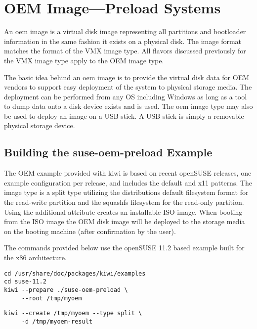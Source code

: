 \chapter{OEM Image---Preload Systems}
\label{chapter:oem}
\minitoc

An oem image is a virtual disk image representing all partitions
and bootloader information in the same fashion it exists on a physical
disk. The image format matches the format of the VMX image type. All flavors
discussed previously for the VMX image type apply to the OEM image type.

The basic idea behind an oem image is to provide the virtual disk data
for OEM vendors to support easy deployment of the system to physical
storage media. The deployment can be performed from any OS including
Windows as long as a tool to dump data onto a disk device exists and is 
used. The oem image type may also be used to deploy an image on a USB stick. 
A USB stick is simply a removable physical storage device.

\section{Building the suse-oem-preload Example}

The OEM example provided with kiwi is based on recent openSUSE releases, 
one example configuration per release, and includes the default and x11 
patterns. The image type is a split type utilizing the distributions default
filesystem format for the read-write partition and the squashfs filesystem 
for the read-only partition. Using the additional  attribute 
creates an installable ISO image. When booting from the ISO image the
OEM disk image will be deployed to the storage media on the booting machine
(after confirmation by the user).

The commands provided below use the openSUSE 11.2 based example built 
for the x86 architecture.

\begin{Command}{12cm}
\begin{verbatim}
cd /usr/share/doc/packages/kiwi/examples
cd suse-11.2
kiwi --prepare ./suse-oem-preload \
     --root /tmp/myoem
\end{verbatim}
\end{Command}

\begin{Command}{12cm}
\begin{verbatim}
kiwi --create /tmp/myoem --type split \
     -d /tmp/myoem-result
\end{verbatim}
\end{Command}


